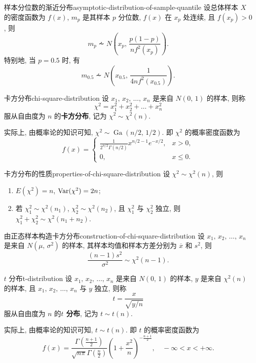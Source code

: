 \begin{newtheorembox}{样本分位数的渐近分布}{asymptotic-distribution-of-sample-quantile}
	设总体样本 $X$ 的密度函数为 $f(x)$, $m_p$ 是其样本 $p$ 分位数, $f(x)$ 在 $x_p$ 处连续, 且 $f(x_p)>0$, 则
	\[
		m_p\dotsim N\left(x_p,\,\frac{p(1-p)}{nf^2(x_p)}\right).
	\]
	特别地, 当 $p=0.5$ 时, 有
	\[
		m_{0.5}\dotsim N\left(x_{0.5},\,\frac{1}{4nf^2(x_{0.5})}\right).
	\]
\end{newtheorembox}

\newcommand{\GaDistri}[2]{\mathop{\mathrm{Ga}}\nolimits\left(#1,\,#2\right)}

\begin{newdefbox}{卡方分布}{chi-square-distribution}
	设 $x_1,\,x_2,\,\dots,\,x_n$ 是来自 $N(0,\,1)$ 的样本, 则称
	\[
		\chi^2=x_1^2+x_2^2+\dots+x_n^2
	\]
	服从自由度为 $n$ 的\textbf{卡方分布}, 记为 $\chi^2\sim\chi^2(n)$.
	\par
	实际上, 由概率论的知识可知, $\chi^2\sim\GaDistri{n/2}{1/2}$.  即 $\chi^2$ 的概率密度函数为
	\[
		f(x)=\begin{cases}
			\frac{1}{2^{n/2}\Gamma(n/2)}x^{n/2-1}e^{-x/2}, & x>0,\\
			0, & x\leqslant 0.
		\end{cases}
	\]
\end{newdefbox}

\begin{newtheorembox}{卡方分布的性质}{properties-of-chi-square-distribution}
	设 $\chi^2\sim\chi^2(n)$, 则
	\begin{enumerate}
		\item $E(\chi^2)=n$, $\mathop{\mathrm{Var}}\nolimits(\chi^2)=2n$;
		\item 若 $\chi_1^2\sim\chi^2(n_1)$, $\chi_2^2\sim\chi^2(n_2)$, 且 $\chi_1^2$ 与 $\chi_2^2$ 独立, 则 $\chi_1^2+\chi_2^2\sim\chi^2(n_1+n_2)$.
	\end{enumerate}
\end{newtheorembox}

\begin{newtheorembox}{由正态样本构造卡方分布}{construction-of-chi-square-distribution}
	设 $x_1,\,x_2,\,\dots,\,x_n$ 是来自 $N(\mu,\,\sigma^2)$ 的样本, 其样本均值和样本方差分别为 $\overline{x}$ 和 $s^2$, 则
	\[
		\frac{(n-1)s^2}{\sigma^2}\sim\chi^2(n-1).
	\]
\end{newtheorembox}

\begin{newdefbox}{$t$ 分布}{t-distribution}
	设 $x_1,\,x_2,\,\dots,\,x_n$ 是来自 $N(0,\,1)$ 的样本, $y$ 是来自 $\chi^2(n)$ 的样本, 且 $x_1,\,x_2,\,\dots,\,x_n$ 与 $y$ 独立, 则称
	\[
		t=\frac{x}{\sqrt{y/n}}
	\]
	服从自由度为 $n$ 的\textbf{$t$ 分布}, 记为 $t\sim t(n)$.
	\par
	实际上, 由概率论的知识可知, $t\sim t(n)$.  即 $t$ 的概率密度函数为
	\[
		f(x)=\frac{\Gamma\left(\frac{n+1}{2}\right)}{\sqrt{n\pi}\Gamma\left(\frac{n}{2}\right)}\left(1+\frac{x^2}{n}\right)^{-\frac{n+1}{2}},\quad -\infty<x<+\infty.
	\]
\end{newdefbox}
